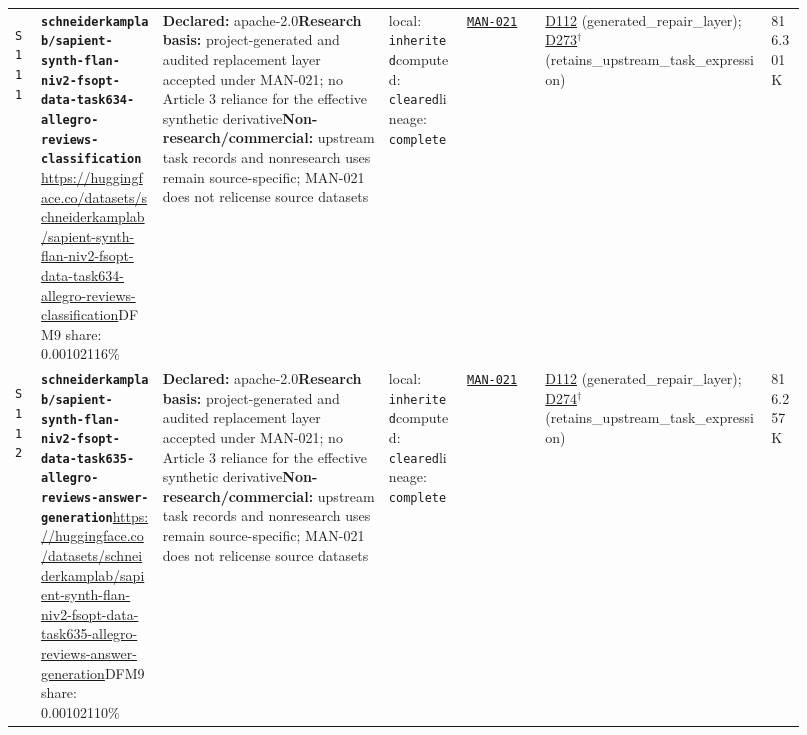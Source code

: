 \documentclass[9pt,a4paper]{article}
\newcommand{\srcid}[1]{\hypertarget{src:#1}{\texttt{#1}}}
\begin{document}
\begin{landscape}
\begin{longtable}{@{}L{0.03\linewidth}L{0.14\linewidth}L{0.26\linewidth}L{0.09\linewidth}L{0.09\linewidth}L{0.265\linewidth}L{0.045\linewidth}@{}}
\srcid{S111} & \textbf{\nolinkurl{schneiderkamplab/sapient-synth-flan-niv2-fsopt-data-task634-allegro-reviews-classification}}\newline \url{https://huggingface.co/datasets/schneiderkamplab/sapient-synth-flan-niv2-fsopt-data-task634-allegro-reviews-classification}\newline DFM9 share: 0.00102116\% & \textbf{Declared:} apache-2.0\newline \textbf{Research basis:} project-generated and audited replacement layer accepted under MAN-021; no Article 3 reliance for the effective synthetic derivative\newline \textbf{Non-research/commercial:} upstream task records and nonresearch uses remain source-specific; MAN-021 does not relicense source datasets & local: \texttt{inherited}\newline computed: \texttt{cleared}\newline lineage: \texttt{complete} & \hyperlink{manual:MAN-021}{\texttt{MAN-021}} & \hyperlink{dep:D112}{D112} (generated\_repair\_layer); \hyperlink{dep:D273}{D273}$^{\dagger}$ (retains\_upstream\_task\_expression) & 816.301K \\
\srcid{S112} & \textbf{\nolinkurl{schneiderkamplab/sapient-synth-flan-niv2-fsopt-data-task635-allegro-reviews-answer-generation}}\newline \url{https://huggingface.co/datasets/schneiderkamplab/sapient-synth-flan-niv2-fsopt-data-task635-allegro-reviews-answer-generation}\newline DFM9 share: 0.00102110\% & \textbf{Declared:} apache-2.0\newline \textbf{Research basis:} project-generated and audited replacement layer accepted under MAN-021; no Article 3 reliance for the effective synthetic derivative\newline \textbf{Non-research/commercial:} upstream task records and nonresearch uses remain source-specific; MAN-021 does not relicense source datasets & local: \texttt{inherited}\newline computed: \texttt{cleared}\newline lineage: \texttt{complete} & \hyperlink{manual:MAN-021}{\texttt{MAN-021}} & \hyperlink{dep:D112}{D112} (generated\_repair\_layer); \hyperlink{dep:D274}{D274}$^{\dagger}$ (retains\_upstream\_task\_expression) & 816.257K \\

\end{longtable}
\end{landscape}
\end{document}
